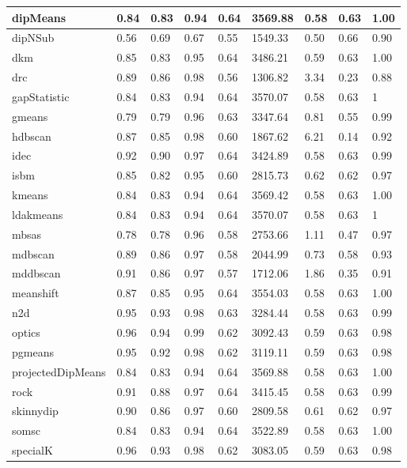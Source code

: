 \begin{table}[H]
\begin{tabular}{|l|l|l|l|l|l|l|l|l|}
\hline
dipMeans & 0.84 & 0.83 & 0.94 & 0.64 & 3569.88 & 0.58 & 0.63 & 1.00 \\
\hline
dipNSub & 0.56 & 0.69 & 0.67 & 0.55 & 1549.33 & 0.50 & 0.66 & 0.90 \\
\hline
dkm & 0.85 & 0.83 & 0.95 & 0.64 & 3486.21 & 0.59 & 0.63 & 1.00 \\
\hline
drc & 0.89 & 0.86 & 0.98 & 0.56 & 1306.82 & 3.34 & 0.23 & 0.88 \\
\hline
gapStatistic & 0.84 & 0.83 & 0.94 & 0.64 & 3570.07 & 0.58 & 0.63 & 1 \\
\hline
gmeans & 0.79 & 0.79 & 0.96 & 0.63 & 3347.64 & 0.81 & 0.55 & 0.99 \\
\hline
hdbscan & 0.87 & 0.85 & 0.98 & 0.60 & 1867.62 & 6.21 & 0.14 & 0.92 \\
\hline
idec & 0.92 & 0.90 & 0.97 & 0.64 & 3424.89 & 0.58 & 0.63 & 0.99 \\
\hline
isbm & 0.85 & 0.82 & 0.95 & 0.60 & 2815.73 & 0.62 & 0.62 & 0.97 \\
\hline
kmeans & 0.84 & 0.83 & 0.94 & 0.64 & 3569.42 & 0.58 & 0.63 & 1.00 \\
\hline
ldakmeans & 0.84 & 0.83 & 0.94 & 0.64 & 3570.07 & 0.58 & 0.63 & 1 \\
\hline
mbsas & 0.78 & 0.78 & 0.96 & 0.58 & 2753.66 & 1.11 & 0.47 & 0.97 \\
\hline
mdbscan & 0.89 & 0.86 & 0.97 & 0.58 & 2044.99 & 0.73 & 0.58 & 0.93 \\
\hline
mddbscan & 0.91 & 0.86 & 0.97 & 0.57 & 1712.06 & 1.86 & 0.35 & 0.91 \\
\hline
meanshift & 0.87 & 0.85 & 0.95 & 0.64 & 3554.03 & 0.58 & 0.63 & 1.00 \\
\hline
n2d & 0.95 & 0.93 & 0.98 & 0.63 & 3284.44 & 0.58 & 0.63 & 0.99 \\
\hline
optics & 0.96 & 0.94 & 0.99 & 0.62 & 3092.43 & 0.59 & 0.63 & 0.98 \\
\hline
pgmeans & 0.95 & 0.92 & 0.98 & 0.62 & 3119.11 & 0.59 & 0.63 & 0.98 \\
\hline
projectedDipMeans & 0.84 & 0.83 & 0.94 & 0.64 & 3569.88 & 0.58 & 0.63 & 1.00 \\
\hline
rock & 0.91 & 0.88 & 0.97 & 0.64 & 3415.45 & 0.58 & 0.63 & 0.99 \\
\hline
skinnydip & 0.90 & 0.86 & 0.97 & 0.60 & 2809.58 & 0.61 & 0.62 & 0.97 \\
\hline
somsc & 0.84 & 0.83 & 0.94 & 0.64 & 3522.89 & 0.58 & 0.63 & 1.00 \\
\hline
specialK & 0.96 & 0.93 & 0.98 & 0.62 & 3083.05 & 0.59 & 0.63 & 0.98 \\

\end{tabular}
\end{table}
